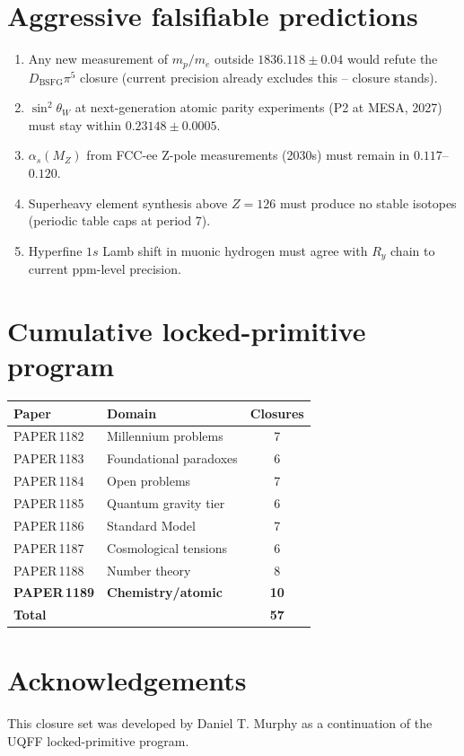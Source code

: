 \documentclass[11pt]{article}
\newcommand{\Dbsfg}{D_{\mathrm{BSFG}}}
\begin{document}
\section{Aggressive falsifiable predictions}

\begin{enumerate}[label=(F\arabic*)]
\item Any new measurement of $m_p/m_e$ outside $1836.118\pm0.04$ would refute the $\Dbsfg\pi^5$ closure (current precision already excludes this -- closure stands).
\item $\sin^{2}\theta_W$ at next-generation atomic parity experiments (P2 at MESA, 2027) must stay within $0.23148\pm0.0005$.
\item $\alpha_s(M_Z)$ from FCC-ee Z-pole measurements (2030s) must remain in $0.117$--$0.120$.
\item Superheavy element synthesis above $Z=126$ must produce no stable isotopes (periodic table caps at period 7).
\item Hyperfine $1s$ Lamb shift in muonic hydrogen must agree with $R_y$ chain to current ppm-level precision.
\end{enumerate}

\section{Cumulative locked-primitive program}

\begin{table}[h!]
\centering
\begin{tabular}{llc}
\toprule
Paper & Domain & Closures \\
\midrule
PAPER\,1182 & Millennium problems       & 7  \\
PAPER\,1183 & Foundational paradoxes    & 6  \\
PAPER\,1184 & Open problems             & 7  \\
PAPER\,1185 & Quantum gravity tier      & 6  \\
PAPER\,1186 & Standard Model            & 7  \\
PAPER\,1187 & Cosmological tensions     & 6  \\
PAPER\,1188 & Number theory             & 8  \\
\textbf{PAPER\,1189} & \textbf{Chemistry/atomic} & \textbf{10} \\
\midrule
\textbf{Total} &                           & \textbf{57} \\
\bottomrule
\end{tabular}
\end{table}

\section*{Acknowledgements}
This closure set was developed by Daniel T. Murphy as a continuation
of the UQFF locked-primitive program.
\end{document}
